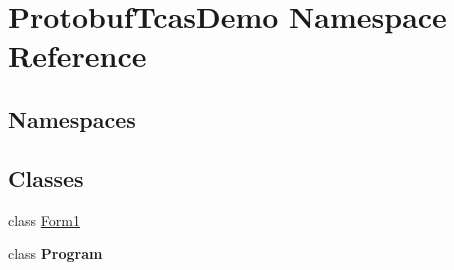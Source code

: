 \hypertarget{namespace_protobuf_tcas_demo}{}\section{Protobuf\+Tcas\+Demo Namespace Reference}
\label{namespace_protobuf_tcas_demo}
\subsection*{Namespaces}
\begin{DoxyCompactItemize}
\end{DoxyCompactItemize}
\subsection*{Classes}
\begin{DoxyCompactItemize}
\item 
class \hyperlink{class_protobuf_tcas_demo_1_1_form1}{Form1}
\item 
class {\bfseries Program}
\end{DoxyCompactItemize}
